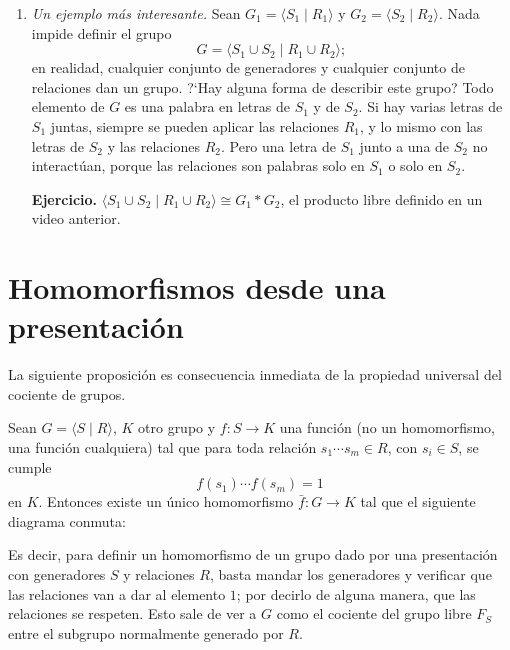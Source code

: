 \documentclass[11pt]{article}
\begin{document}
\begin{enumerate}
  \item \emph{Un ejemplo más interesante.} Sean $G_1=\langle S_1\mid R_1\rangle$ y $G_2=\langle S_2\mid R_2\rangle$. Nada impide definir el grupo
  \[
    G=\langle S_1\cup S_2\mid R_1\cup R_2\rangle;
  \]
  en realidad, cualquier conjunto de generadores y cualquier conjunto de relaciones dan un grupo. ?`Hay alguna forma de describir este grupo? Todo elemento de $G$ es una palabra en letras de $S_1$ y de $S_2$. Si hay varias letras de $S_1$ juntas, siempre se pueden aplicar las relaciones $R_1$, y lo mismo con las letras de $S_2$ y las relaciones $R_2$. Pero una letra de $S_1$ junto a una de $S_2$ no interactúan, porque las relaciones son palabras solo en $S_1$ o solo en $S_2$.

  \noindent\textbf{Ejercicio.} $\langle S_1\cup S_2\mid R_1\cup R_2\rangle\cong G_1*G_2$, el producto libre definido en un video anterior.
\end{enumerate}

\section*{Homomorfismos desde una presentación}

La siguiente proposición es consecuencia inmediata de la propiedad universal del cociente de grupos.

\begin{prop}\label{prop:hom-presentacion}
Sean $G=\langle S\mid R\rangle$, $K$ otro grupo y $f\colon S\to K$ una función (no un homomorfismo, una función cualquiera) tal que para toda relación $s_1\cdots s_m\in R$, con $s_i\in S$, se cumple
\[
  f(s_1)\cdots f(s_m)=1
\]
en $K$. Entonces existe un único homomorfismo $\bar f\colon G\to K$ tal que el siguiente diagrama conmuta:
\end{prop}

\begin{center}
\end{center}

Es decir, para definir un homomorfismo de un grupo dado por una presentación con generadores $S$ y relaciones $R$, basta mandar los generadores y verificar que las relaciones van a dar al elemento $1$; por decirlo de alguna manera, que las relaciones se respeten. Esto sale de ver a $G$ como el cociente del grupo libre $F_S$ entre el subgrupo normalmente generado por $R$.
\end{document}
